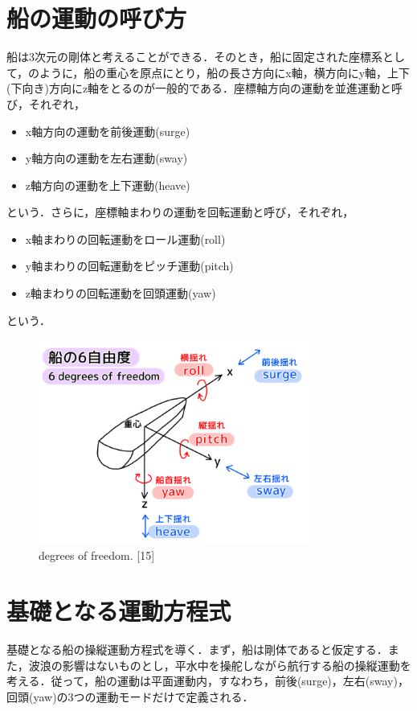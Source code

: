 \section{船の運動の呼び方}
船は3次元の剛体と考えることができる．そのとき，船に固定された座標系として，のように，船の重心を原点にとり，船の長さ方向にx軸，横方向にy軸，上下(下向き)方向にz軸をとるのが一般的である．座標軸方向の運動を並進運動と呼び，それぞれ，

\begin{itemize}
	\item x軸方向の運動を前後運動(surge)
    \item y軸方向の運動を左右運動(sway)
    \item z軸方向の運動を上下運動(heave)
\end{itemize}

という．さらに，座標軸まわりの運動を回転運動と呼び，それぞれ，

\begin{itemize}
	\item x軸まわりの回転運動をロール運動(roll)
    \item y軸まわりの回転運動をピッチ運動(pitch)
    \item z軸まわりの回転運動を回頭運動(yaw)
\end{itemize}

という．

\begin{figure}[htbp]
    \centering   
    \includegraphics[width=0.8\textwidth]{img/appendix3/2-1.png}
    \caption{degrees of freedom. [15]}
    \label{fig:2-1_png}
\end{figure}

\section{基礎となる運動方程式}
基礎となる船の操縦運動方程式を導く．まず，船は剛体であると仮定する．また，波浪の影響はないものとし，平水中を操舵しながら航行する船の操縦運動を考える．従って，船の運動は平面運動内，すなわち，前後(surge)，左右(sway)，回頭(yaw)の3つの運動モードだけで定義される．

